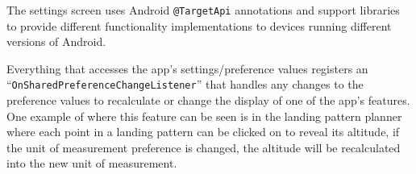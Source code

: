 The settings screen uses Android \texttt{@TargetApi} annotations and support libraries to provide different functionality implementations to devices running different versions of Android.

Everything that accesses the app's settings/preference values registers an ``\texttt{OnSharedPreference\-ChangeListener}'' that handles any changes to the preference values to recalculate or change the display of one of the app's features. One example of where this feature can be seen is in the landing pattern planner where each point in a landing pattern can be clicked on to reveal its altitude, if the unit of measurement preference is changed, the altitude will be recalculated into the new unit of measurement.


